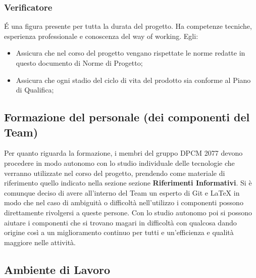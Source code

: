 \subsubsection{Verificatore}
\'E una figura presente per tutta la durata del progetto. Ha competenze tecniche, esperienza professionale e conoscenza del way of working.	
Egli:
\begin{itemize}
\item{Assicura che nel corso del progetto vengano rispettate le norme redatte in questo documento di Norme di Progetto;}
\item{Assicura che ogni stadio del ciclo di vita del prodotto sia conforme al Piano di Qualifica;}
\end{itemize}


\subsection{Formazione del personale (dei componenti del Team)}
Per quanto riguarda la formazione, i membri del gruppo DPCM 2077 devono procedere in modo autonomo con lo studio individuale delle tecnologie che verranno utilizzate nel corso del progetto, prendendo come materiale di riferimento quello indicato nella sezione sezione \textbf{Riferimenti Informativi}. Si è comunque deciso di avere all'interno del Team un esperto di Git e {\LaTeX} in modo che nel caso di ambiguità o difficoltà nell'utilizzo i componenti possono direttamente
rivolgersi a queste persone. Con lo studio autonomo poi si possono aiutare i componenti che si trovano magari in difficoltà con qualcosa dando origine così a un miglioramento continuo per tutti e un'efficienza e qualità maggiore nelle attività.


\subsection{Ambiente di Lavoro}

